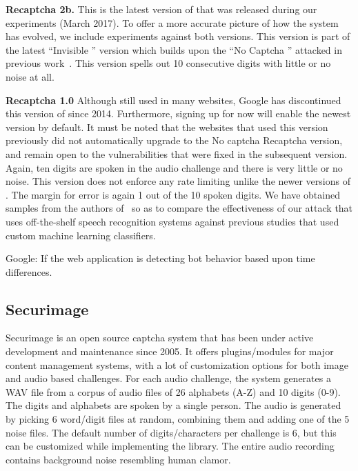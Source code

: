 \textbf{Recaptcha 2b.} This is the latest version of \re that was released during our experiments (March 2017). 
To offer a more accurate picture of how the system has evolved, we include experiments against both versions.
This version is part of the latest ``Invisible \re'' version which builds upon the ``No Captcha \re'' attacked in 
previous work~\cite{sivakorn:eurosp16}. This version spells out 10 consecutive digits with little or no noise at all.

\textbf{Recaptcha 1.0} Although still used in many websites, Google has discontinued this version of \re since 2014.
Furthermore, signing up for \re now will enable the newest version by default. It must be
noted that the websites that used this version previously did not automatically upgrade to the No 
captcha Recaptcha version, and remain open to the vulnerabilities that were fixed in the subsequent 
version. Again, ten digits are spoken in the audio challenge and there is very little or no noise. This 
version does not enforce any rate limiting unlike the newer versions of \re. The margin for error 
is again 1 out of the 10 spoken digits. We have obtained  samples from the authors 
of~\cite{meutzner2014using} so as to compare the effectiveness of our attack that uses 
off-the-shelf speech recognition systems against previous studies that used custom
machine learning classifiers.

 Google: If the web application is detecting bot behavior based upon time differences.


\subsection{Securimage}

Securimage is an open source captcha system that has been under active development and maintenance 
since 2005. It offers plugins/modules for major content management systems, with a lot of customization 
options for both image and audio based challenges. For each audio challenge, the system generates a WAV 
file from a corpus of audio files of 26 alphabets (A-Z) and 10 digits (0-9). The digits and alphabets are 
spoken by a single person. The audio is generated by picking 6 word/digit files at random, combining them and adding one 
of the 5 noise files. The default number of digits/characters per challenge is 6, but this can 
be customized while implementing the library. The entire audio recording contains background noise resembling
human clamor.

